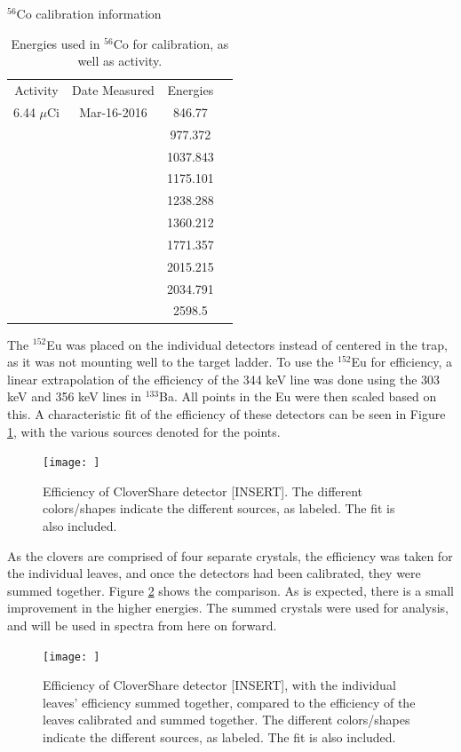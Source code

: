 \begin{table}[]
    \centering
    \caption{$^56$Co calibration information}
    \begin{tabular}{c|c|c|c}
         Activity & Date Measured & Energies  \hline \\
         6.44 $\mu$Ci & Mar-16-2016 & 846.77 \\
         & & 977.372 \\
         & & 1037.843 \\
         & & 1175.101 \\
         & & 1238.288 \\
         & & 1360.212 \\
         & & 1771.357 \\
         & & 2015.215 \\
         & & 2034.791 \\
         & & 2598.5 \\
    \end{tabular}
    \caption{Energies used in $^{56}$Co for calibration, as well as activity.}
    \label{tab:Co_Energy}
\end{table}

The $^{152}$Eu was placed on the individual detectors instead of centered in the trap, as it was not mounting well to the target ladder. To use the $^{152}$Eu for efficiency, a linear extrapolation of the efficiency of the 344 keV line was done using the 303 keV and 356 keV lines in $^{133}$Ba. All points in the Eu were then scaled based on this. A characteristic fit of the efficiency of these detectors can be seen in Figure \ref{fig:Clover_eff}, with the various sources denoted for the points.

\begin{figure}
    \centering
    \texttt{[image: ]}
    \caption{Efficiency of CloverShare detector [INSERT]. The different colors/shapes indicate the different sources, as labeled. The fit is also included.}
    \label{fig:Clover_eff}
\end{figure}

As the clovers are comprised of four separate crystals, the efficiency was taken for the individual leaves, and once the detectors had been calibrated, they were summed together. Figure \ref{fig:Clover_ind_vs_sum} shows the comparison. As is expected, there is a small improvement in the higher energies. The summed crystals were used for analysis, and will be used in spectra from here on forward.

\begin{figure}
    \centering
    \texttt{[image: ]}
    \caption{Efficiency of CloverShare detector [INSERT], with the individual leaves' efficiency summed together, compared to the efficiency of the leaves calibrated and summed together. The different colors/shapes indicate the different sources, as labeled. The fit is also included.}
    \label{fig:Clover_ind_vs_sum}
\end{figure}

